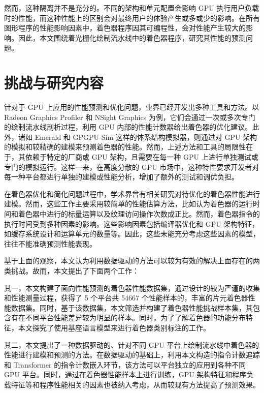 然而，这种隔离并不是充分的。不同的架构和单元配置会影响 GPU 执行用户负载时的性能，而这种性能上的区别会对最终用户的体验产生或多或少的影响。在所有图形程序的性能影响因素中，着色器程序因其可编程性，会对性能产生较大的影响。因此，本文围绕着光栅化绘制流水线中的着色器程序，研究其性能的预测问题。

\section{{\amend 挑战与研究内容}}

\label{sec:challenge}

针对于 GPU 上应用的性能预测和优化问题，业界已经开发出多种工具和方法。以 Radeon Graphics Profiler\cite{AMDRGP} 和 NSight Graphics\cite{NSightGraphics} 为例，它们会通过一次或多次专门的绘制流水线剖析过程，利用 GPU 内部的性能计数器给出着色器的优化建议。此外，诸如 Emerald \cite{10.1145/3307650.3322221} 和 GPGPU-Sim \cite{4919648} 这样的体系结构模拟器，则通过对 GPU 架构的模拟和较精确的建模来预测着色器的性能。然而，上述方法和工具的局限性在于，其依赖于特定的厂商或 GPU 架构，且需要在每一种 GPU 上进行单独测试或专门的模拟运行。这样一来，在高度分散的 GPU 市场中，这种特性要求开发者对每一种平台都进行单独的建模或性能分析，增加了额外的测试和调优负担。

在着色器优化和简化问题过程中，学术界曾有相关研究对待优化的着色器性能进行建模\cite{10.1145/2816795.2818104, 10.1111/cgf.13482, 10.1145/3528233.3530722}。然而，这些工作主要采用较简单的性能估算方法，比如认为着色器的运行时间和着色器中进行的标量运算以及纹理访问操作次数成正比。然而，着色器指令的执行时间受到多种因素的影响。这些影响因素包括编译器优化和 GPU 架构特征，如缓存系统设计和运算单元的数量等。因此，这些未能充分考虑这些因素的模型，往往不能准确预测性能表现。

{\amend 基于上面的观察，本文认为利用数据驱动的方法可以较为有效的解决上面存在的两类挑战。故而，本文提出了下面两个工作：}

{\added 其一，本文构建了面向性能预测的着色器性能数据集，通过设计的较为严谨的收集和性能测量过程，获得了 5 个平台共 54667 个性能样本的，丰富的片元着色器性能数据集。同时，基于该数据集，本文筛选并构建了着色器性能挑战样本集，其包含有在不同平台性能差异较为明显的样本。同时，为了了解着色器的功能分布特征，本文探究了使用基座语言模型来进行着色器类别标注的工作。}

{\amend 其二，本文提出了一种数据驱动的、}针对不同 GPU 平台上绘制流水线中着色器的性能进行建模和预测的方法。在数据驱动的基础上，{\amend 利用本文构造的指令计数追踪和 Transformer 的指令计数嵌入环节，该方法可以平台独立的应用到各种不同 GPU 平台。}同时，通过在着色器性能样本上进行训练，GPU 架构特征和程序负载特征等和程序性能相关的因素也被纳入考虑，从而较现有方法提高了预测效果。


